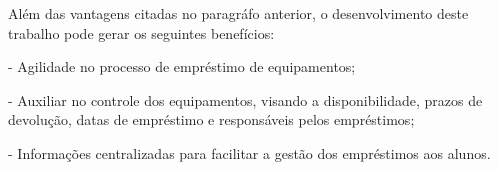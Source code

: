     Além das vantagens citadas no paragráfo anterior, o desenvolvimento deste trabalho pode gerar os seguintes benefícios:
    
     - Agilidade no processo de empréstimo de equipamentos;
     
     - Auxiliar no controle dos equipamentos, visando a disponibilidade, prazos de devolução, datas de empréstimo e responsáveis pelos empréstimos;
     
     - Informações centralizadas para facilitar a gestão dos empréstimos aos alunos.